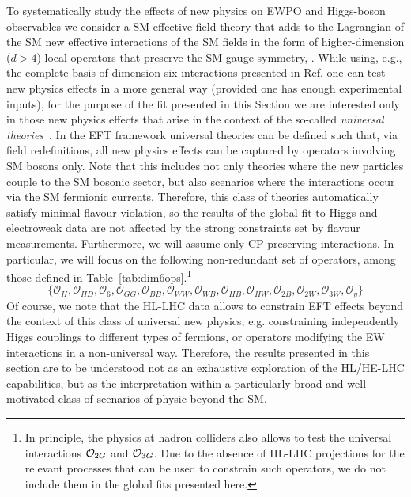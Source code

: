 To systematically study the effects of new physics on EWPO and
Higgs-boson observables we consider a SM effective field theory
 that adds to the Lagrangian of the SM new effective
interactions of the SM fields in the form of higher-dimension ($d>4$)
local operators that preserve the SM gauge symmetry, .
While using, e.g., the
complete basis of dimension-six interactions presented in
Ref. \cite{Grzadkowski:2010es} one can test new physics effects in 
a more general way (provided one has enough experimental inputs),
for the purpose of the fit presented in this Section we are interested only in those
new physics effects that arise in the context of the so-called {\it universal theories}~\cite{Barbieri:2004qk,Wells:2015uba}.
In the EFT framework universal theories can be defined such that, via field redefinitions, all new physics effects
can be captured by operators involving SM bosons only. Note that this includes not only theories where the
new particles couple to the SM bosonic sector, but also scenarios where the interactions 
occur via the SM fermionic currents. Therefore, this class of theories automatically 
satisfy minimal flavour violation, so the results of the global fit to Higgs and electroweak data 
are not affected by the strong constraints set by flavour measurements. Furthermore,
we will assume only CP-preserving interactions. 
In particular, we will focus on the following non-redundant set of operators, among those defined in Table~\ref{tab:dim6ops}.\footnote{In principle, the physics at hadron colliders also allows to test the universal interactions ${\cal O}_{2G}$ and ${\cal O}_{3G}$. Due to the absence of HL-LHC projections for the relevant processes that can be used to constrain such operators, we do not include them in the global fits presented here.} 
%
\begin{equation}
\label{eq:universal}
%
\{\mathcal{O}_{H}, \mathcal{O}_{H D} ,
\mathcal{O}_{6} ,
\mathcal{O}_{G G} ,
\mathcal{O}_{B B} ,
\mathcal{O}_{W W} ,
\mathcal{O}_{W B} ,
\mathcal{O}_{HB} ,
\mathcal{O}_{HW} ,
\mathcal{O}_{2B} ,
\mathcal{O}_{2W} ,
\mathcal{O}_{3W} ,
\mathcal{O}_{y} \}
\end{equation}
%
Of course, we note that the HL-LHC data allows to constrain EFT effects beyond the context of this class of universal new physics, 
e.g. constraining independently Higgs couplings to different types of fermions, or operators modifying the EW interactions
in a non-universal way. Therefore, the results presented in this section are to be understood not as an exhaustive exploration 
of the HL/HE-LHC capabilities, but as the interpretation within a particularly broad and well-motivated class
of scenarios of physic beyond the SM.


